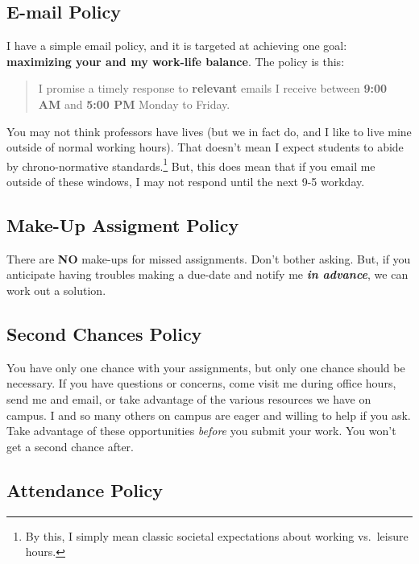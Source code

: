 \documentclass[11pt,]{article}
\begin{document}
\hypertarget{e-mail-policy}{%
\subsection{E-mail Policy}\label{e-mail-policy}}

I have a simple email policy, and it is targeted at achieving one goal:
\textbf{maximizing your and my work-life balance}. The policy is this:

\begin{quote}
I promise a timely response to \textbf{relevant} emails I receive
between \textbf{9:00 AM} and \textbf{5:00 PM} Monday to Friday.
\end{quote}

You may not think professors have lives (but we in fact do, and I like
to live mine outside of normal working hours). That doesn't mean I
expect students to abide by chrono-normative standards.\footnote{By
  this, I simply mean classic societal expectations about working
  vs.~leisure hours.} But, this does mean that if you email me outside
of these windows, I may not respond until the next 9-5 workday.

\hypertarget{make-up-assigment-policy}{%
\subsection{Make-Up Assigment Policy}\label{make-up-assigment-policy}}

There are \textbf{NO} make-ups for missed assignments. Don't bother
asking. But, if you anticipate having troubles making a due-date and
notify me \textbf{\emph{in advance}}, we can work out a solution.

\hypertarget{second-chances-policy}{%
\subsection{Second Chances Policy}\label{second-chances-policy}}

You have only one chance with your assignments, but only one chance
should be necessary. If you have questions or concerns, come visit me
during office hours, send me and email, or take advantage of the various
resources we have on campus. I and so many others on campus are eager
and willing to help if you ask. Take advantage of these opportunities
\emph{before} you submit your work. You won't get a second chance after.

\hypertarget{attendance-policy}{%
\subsection{Attendance Policy}\label{attendance-policy}}
\end{document}
